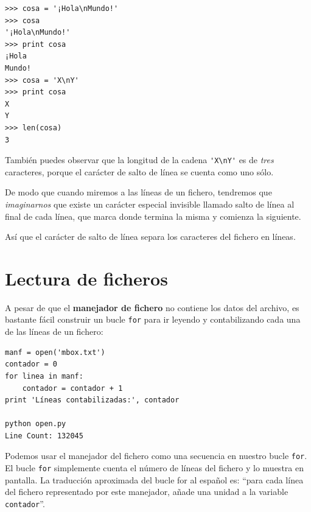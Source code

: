 \beforeverb
\begin{verbatim}
>>> cosa = '¡Hola\nMundo!'
>>> cosa
'¡Hola\nMundo!'
>>> print cosa
¡Hola
Mundo!
>>> cosa = 'X\nY'
>>> print cosa
X
Y
>>> len(cosa)
3
\end{verbatim}
\afterverb
%

También puedes observar que la longitud de la cadena \verb"'X\nY'" es de \emph{tres}
caracteres, porque el carácter de salto de línea se cuenta como uno sólo.

De modo que cuando miremos a las líneas de un fichero, tendremos que \emph{imaginarnos}
que existe un carácter especial invisible llamado salto de línea al
final de cada línea, que marca donde termina la misma y comienza la siguiente.


Así que el carácter de salto de línea separa los caracteres
del fichero en líneas.

\section{Lectura de ficheros}

A pesar de que el {\bf manejador de fichero} no contiene los datos del archivo,
es bastante fácil construir un bucle {\tt for} para ir leyendo
y contabilizando cada una de las líneas de un fichero:

\beforeverb
\begin{verbatim}
manf = open('mbox.txt')
contador = 0
for linea in manf:
    contador = contador + 1
print 'Líneas contabilizadas:', contador

python open.py 
Line Count: 132045
\end{verbatim}
\afterverb
%
Podemos usar el manejador del fichero como una secuencia en nuestro bucle {\tt for}.
El bucle {\tt for} simplemente cuenta el número de líneas del
fichero y lo muestra en pantalla. La traducción aproximada del bucle for
al español es: ``para cada línea del fichero representado por este
manejador, añade una unidad a la variable {\tt contador}''.

